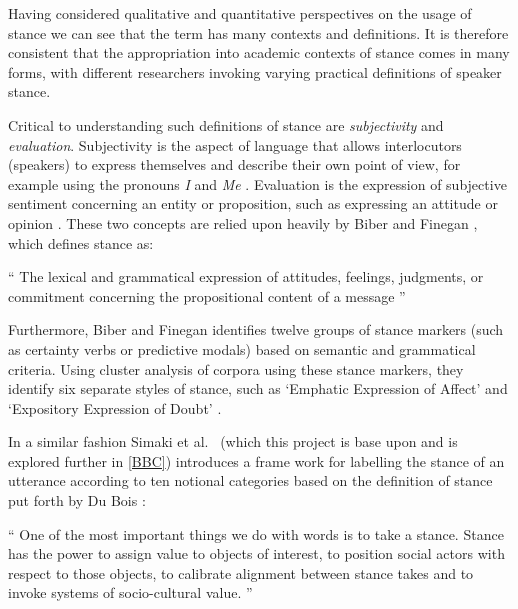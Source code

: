 \documentclass[Dissertation.tex]{subfiles}
\begin{document}

Having considered qualitative and quantitative perspectives on the usage of stance we can see that the term has many contexts and definitions.  It is therefore consistent that the appropriation into academic contexts of stance comes in many forms, with different researchers invoking varying practical definitions of speaker stance.

Critical to understanding such definitions of stance are \textit{subjectivity} and \textit{evaluation}. Subjectivity is the aspect of language that allows interlocutors (speakers)  to express themselves and describe their own point of view, for example using the pronouns \textit{I} and \textit{Me} \cite{matthewsSubjectivity2014}. Evaluation is the expression of subjective sentiment concerning an entity or proposition, such as expressing an attitude or opinion \cite{hunstonEvaluationTextAuthorial2000}. These two concepts are relied upon heavily by Biber and Finegan \cite{biberStylesStanceEnglish1989}, which defines stance as:

\begin{displayquote} `` The lexical and grammatical expression of attitudes, feelings, judgments, or commitment concerning the propositional content of a message ''
\end{displayquote}


Furthermore, Biber and Finegan \cite{biberStylesStanceEnglish1989} identifies twelve groups of stance markers (such as certainty verbs or predictive modals) based on semantic and grammatical criteria. Using cluster analysis of corpora using these stance markers, they identify six separate styles of stance, such as ‘Emphatic Expression of Affect’ and ‘Expository Expression of Doubt’ \cite{biberStylesStanceEnglish1989}. 

In a similar fashion Simaki et al.\ \cite{simakiAnnotatingSpeakerStance2017} (which this project is base upon and is explored further in \ref{BBC}) introduces a frame work for labelling the stance of an utterance according to ten notional categories based on the definition of stance put forth by Du Bois \cite{duboisStanceTriangle2007}:

\begin{displayquote}
	`` One of the most important things we do with words is to take a stance. Stance has the power to assign value to objects of interest, to position social actors with respect to those objects, to calibrate alignment between stance takes and to invoke systems of socio-cultural value. ''
\end{displayquote}
\end{document}
